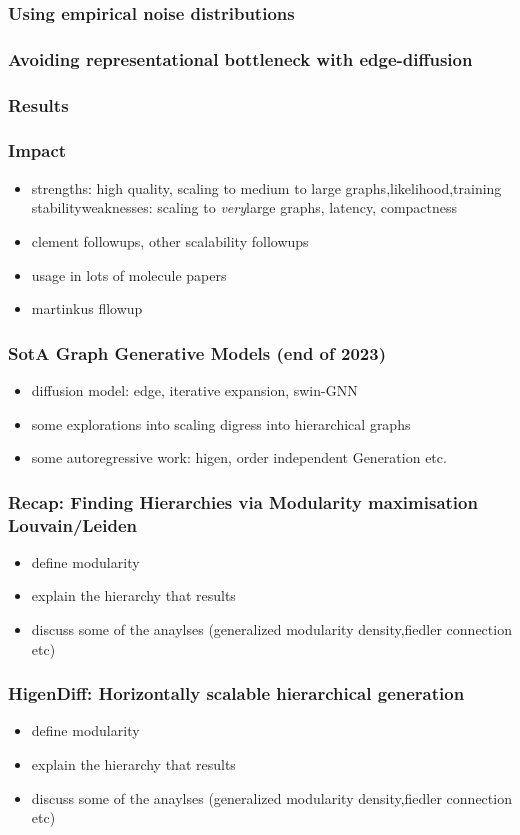 \documentclass[./presentation.tex]{subfiles}
\begin{document}
\begin{frame}[label=working]
  \frametitle{Using empirical noise distributions}
\end{frame}
\begin{frame}[label=working]
  \frametitle{Avoiding representational bottleneck with edge-diffusion}
\end{frame}
\begin{frame}[label=working]
  \frametitle{Results}
  
\end{frame}
\begin{frame}[label=working]
  \frametitle{Impact}
  \begin{itemize}
    \item strengths: high quality\checkmark, scaling to medium to large graphs\checkmark,likelihood\checkmark,training stability\checkmark weaknesses:  scaling to \emph{very}large graphs, latency, compactness
    \item clement followups, other scalability followups
    \item usage in lots of molecule papers
    \item martinkus fllowup
  \end{itemize}
\end{frame}
\begin{frame}[label=working]
  \frametitle{SotA Graph Generative Models (end of 2023)}
  \begin{itemize}
    \item diffusion model: edge, iterative expansion, swin-GNN
    \item some explorations into scaling digress into hierarchical graphs
    \item some autoregressive work: higen, order independent Generation etc.
  \end{itemize}
\end{frame}
\begin{frame}[label=working]
  \frametitle{Recap: Finding Hierarchies via Modularity maximisation Louvain/Leiden}
  \begin{itemize}
    \item define modularity
    \item explain the hierarchy that results
    \item discuss some of the anaylses (generalized modularity density,fiedler connection etc)
  \end{itemize}
\end{frame}
\begin{frame}[label=working]
  \frametitle{HigenDiff: Horizontally scalable hierarchical generation}
  \begin{itemize}
    \item define modularity
    \item explain the hierarchy that results
    \item discuss some of the anaylses (generalized modularity density,fiedler connection etc)
  \end{itemize}
\end{frame}
\end{document}

